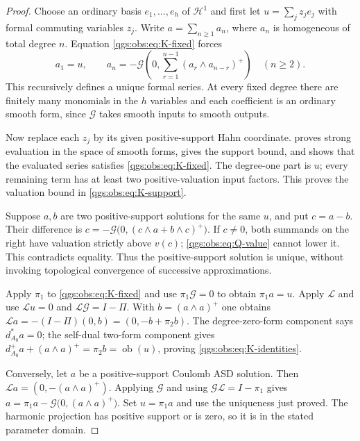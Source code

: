 \documentclass[11pt,oneside]{article}
\numberwithin{equation}{section}
\theoremstyle{plain}
\theoremstyle{definition}
\theoremstyle{remark}
\newcommand{\Lop}{\mathcal L}
\newcommand{\Green}{\mathcal G}
\newcommand{\ob}{\operatorname{ob}}
\begin{document}
\begin{proof}
Choose an ordinary basis $e_1,\ldots,e_h$ of $\mathcal H^1$ and first let $u=\sum_jz_je_j$ with formal commuting variables $z_j$. Write $a=\sum_{n\ge1}a_n$, where $a_n$ is homogeneous of total degree $n$. Equation \eqref{qgs:obs:eq:K-fixed} forces
\begin{equation}\label{qgs:obs:eq:K-recursion}
 a_1=u,\qquad
 a_n=-\Green\left(0,\sum_{r=1}^{n-1}(a_r\wedge a_{n-r})^+\right)
 \quad(n\ge2).
\end{equation}
This recursively defines a unique formal series. At every fixed degree there are finitely many monomials in the $h$ variables and each coefficient is an ordinary smooth form, since $\Green$ takes smooth inputs to smooth outputs.

Now replace each $z_j$ by its given positive-support Hahn coordinate.  proves strong evaluation in the space of smooth forms, gives the support bound, and shows that the evaluated series satisfies \eqref{qgs:obs:eq:K-fixed}. The degree-one part is $u$; every remaining term has at least two positive-valuation input factors. This proves the valuation bound in \eqref{qgs:obs:eq:K-support}.

Suppose $a,b$ are two positive-support solutions for the same $u$, and put $c=a-b$. Their difference is $c=-\Green\bigl(0,(c\wedge a+b\wedge c)^+\bigr)$. If $c\ne0$, both summands on the right have valuation strictly above $v(c)$; \eqref{qgs:obs:eq:Q-value} cannot lower it. This contradicts equality. Thus the positive-support solution is unique, without invoking topological convergence of successive approximations.

Apply $\pi_1$ to \eqref{qgs:obs:eq:K-fixed} and use $\pi_1\Green=0$ to obtain $\pi_1a=u$. Apply $\Lop$ and use $\Lop u=0$ and $\Lop\Green=I-\Pi$. With $b=(a\wedge a)^+$ one obtains $\Lop a=-(I-\Pi)(0,b)=(0,-b+\pi_2b)$. The degree-zero-form component says $d_{A_0}^*a=0$; the self-dual two-form component gives $d_{A_0}^+a+(a\wedge a)^+=\pi_2b=\ob(u)$, proving \eqref{qgs:obs:eq:K-identities}.

Conversely, let $a$ be a positive-support Coulomb ASD solution. Then $\Lop a=(0,-(a\wedge a)^+)$. Applying $\Green$ and using $\Green\Lop=I-\pi_1$ gives $a=\pi_1a-\Green\bigl(0,(a\wedge a)^+\bigr)$. Set $u=\pi_1a$ and use the uniqueness just proved. The harmonic projection has positive support or is zero, so it is in the stated parameter domain.
\end{proof}
\end{document}
